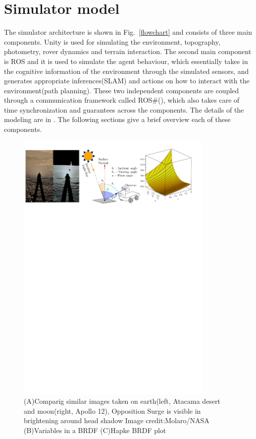 \documentclass[a4paper, 10pt, conference]{ieeeconf}      %
\begin{document}
\section{Simulator model}
The simulator architecture is shown in Fig.~\ref{flowchart} and consists of three main components. Unity is used for simulating the environment, topography, photometry, rover dynamics and terrain interaction. The second main component is ROS and it is used to simulate the agent behaviour, which essentially takes in the cognitive information of the environment through the simulated sensors, and generates appropriate inferences(SLAM) and actions on how to interact with the environment(path planning). These two independent components are coupled through a communication framework called ROS\#(\cite{bischoffm_2019_06}), which also takes care of time synchronization and guarantees across the components. The details of the modeling are in \cite{msm2020rss}. The following sections give a brief overview each of these components.
\begin{figure}[t]
      \centering
        \includegraphics[width=0.85\textwidth]{Figures/brdf_mod_iros.pdf}
      \caption{(A)Comparig similar images taken on earth(left, Atacama desert and moon(right, Apollo 12), Opposition Surge is visible in brightening around head shadow Image credit:Molaro/NASA (B)Variables in a BRDF (C)Hapke BRDF plot}
      \vspace{-1em}
      \label{osbrdf}
\end{figure}
\end{document}
